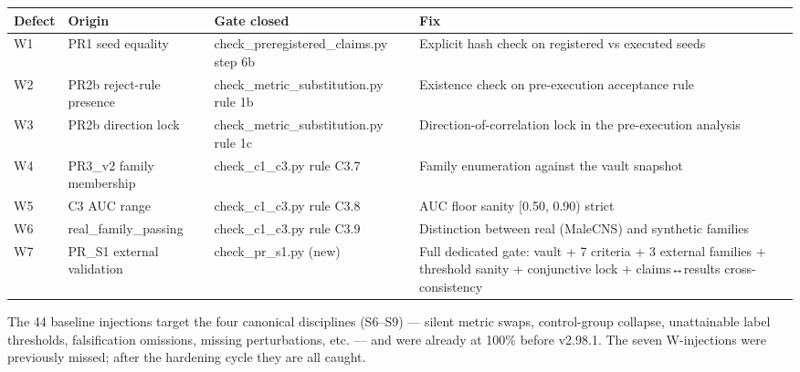 \documentclass[
]{article}
\newcounter{none} %
\begin{document}
{\def\LTcaptype{none} %
\begin{longtable}[]{@{}
  >{\raggedright\arraybackslash}p{}
  >{\raggedright\arraybackslash}p{}
  >{\raggedright\arraybackslash}p{}
  >{\raggedright\arraybackslash}p{}@{}}
\toprule\noalign{}
\begin{minipage}[b]{\linewidth}\raggedright
Defect
\end{minipage} & \begin{minipage}[b]{\linewidth}\raggedright
Origin
\end{minipage} & \begin{minipage}[b]{\linewidth}\raggedright
Gate closed
\end{minipage} & \begin{minipage}[b]{\linewidth}\raggedright
Fix
\end{minipage} \\
\midrule\noalign{}
\endhead
\bottomrule\noalign{}
\endlastfoot
W1 & PR1 seed equality & check\_preregistered\_claims.py step 6b &
Explicit hash check on registered vs executed seeds \\
W2 & PR2b reject-rule presence & check\_metric\_substitution.py rule 1b
& Existence check on pre-execution acceptance rule \\
W3 & PR2b direction lock & check\_metric\_substitution.py rule 1c &
Direction-of-correlation lock in the pre-execution analysis \\
W4 & PR3\_v2 family membership & check\_c1\_c3.py rule C3.7 & Family
enumeration against the vault snapshot \\
W5 & C3 AUC range & check\_c1\_c3.py rule C3.8 & AUC floor sanity
{[}0.50, 0.90) strict \\
W6 & real\_family\_passing & check\_c1\_c3.py rule C3.9 & Distinction
between real (MaleCNS) and synthetic families \\
W7 & PR\_S1 external validation & check\_pr\_s1.py (new) & Full
dedicated gate: vault + 7 criteria + 3 external families + threshold
sanity + conjunctive lock + claims↔results cross-consistency \\
\end{longtable}
}

The 44 baseline injections target the four canonical disciplines
(S6--S9) --- silent metric swaps, control-group collapse, unattainable
label thresholds, falsification omissions, missing perturbations, etc.
--- and were already at 100\% before v2.98.1. The seven W-injections
were previously missed; after the hardening cycle they are all caught.
\end{document}
